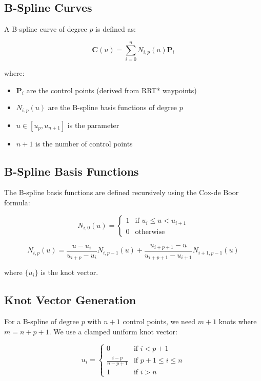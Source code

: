 \documentclass[11pt]{article}
\begin{document}
\subsection{B-Spline Curves}

A B-spline curve of degree $p$ is defined as:

\begin{equation}
\mathbf{C}(u) = \sum_{i=0}^{n} N_{i,p}(u) \mathbf{P}_i
\end{equation}

where:
\begin{itemize}
    \item $\mathbf{P}_i$ are the control points (derived from RRT* waypoints)
    \item $N_{i,p}(u)$ are the B-spline basis functions of degree $p$
    \item $u \in [u_p, u_{n+1}]$ is the parameter
    \item $n+1$ is the number of control points
\end{itemize}

\subsection{B-Spline Basis Functions}

The B-spline basis functions are defined recursively using the Cox-de Boor formula:

\begin{equation}
N_{i,0}(u) = \begin{cases}
1 & \text{if } u_i \leq u < u_{i+1} \\
0 & \text{otherwise}
\end{cases}
\end{equation}

\begin{equation}
N_{i,p}(u) = \frac{u - u_i}{u_{i+p} - u_i} N_{i,p-1}(u) + \frac{u_{i+p+1} - u}{u_{i+p+1} - u_{i+1}} N_{i+1,p-1}(u)
\end{equation}

where $\{u_i\}$ is the knot vector.

\subsection{Knot Vector Generation}

For a B-spline of degree $p$ with $n+1$ control points, we need $m+1$ knots where $m = n + p + 1$. We use a clamped uniform knot vector:

\begin{equation}
u_i = \begin{cases}
0 & \text{if } i < p+1 \\
\frac{i-p}{n-p+1} & \text{if } p+1 \leq i \leq n \\
1 & \text{if } i > n
\end{cases}
\end{equation}
\end{document}
